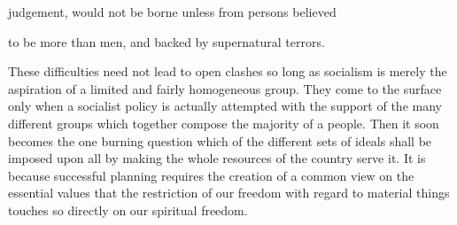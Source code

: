 \documentclass[11pt,openany]{book}
\begin{document}
judgement, would not be borne unless from persons believed

to be more than men, and backed by supernatural terrors.

\begin{center}\textasteriskcentered\hspace{0.9em}\textasteriskcentered\hspace{0.9em}\textasteriskcentered\end{center}

\begin{center}\textasteriskcentered\hspace{0.9em}\textasteriskcentered\hspace{0.9em}\textasteriskcentered\end{center}

\begin{center}\textasteriskcentered\hspace{0.9em}\textasteriskcentered\hspace{0.9em}\textasteriskcentered\end{center}

\begin{center}\textasteriskcentered\hspace{0.9em}\textasteriskcentered\hspace{0.9em}\textasteriskcentered\end{center}

\begin{center}\textasteriskcentered\hspace{0.9em}\textasteriskcentered\hspace{0.9em}\textasteriskcentered\end{center}

These difficulties need not lead to open clashes so long as socialism is merely the aspiration of a limited and fairly homogeneous group. They come to the surface only when a socialist policy is actually attempted with the support of the many different groups which together compose the majority of a people. Then it soon becomes the one burning question which of the different sets of ideals shall be imposed upon all by making the whole resources of the country serve it. It is because successful planning requires the creation of a common view on the essential values that the restriction of our freedom with regard to material things touches so directly on our spiritual freedom.
\end{document}
